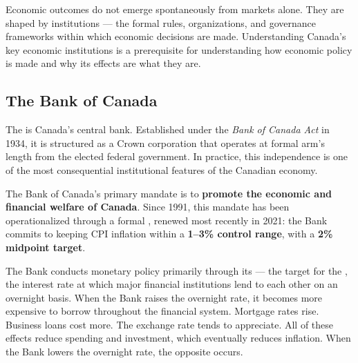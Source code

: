 Economic outcomes do not emerge spontaneously from markets alone. They are
shaped by institutions --- the formal rules, organizations, and governance
frameworks within which economic decisions are made. Understanding Canada's
key economic institutions is a prerequisite for understanding how economic
policy is made and why its effects are what they are.

\subsection{The Bank of Canada}

The  is Canada's central bank. Established under the
\textit{Bank of Canada Act} in 1934, it is structured as a Crown corporation
that operates at formal arm's length from the elected federal government.
In practice, this independence is one of the most consequential institutional
features of the Canadian economy.

The Bank of Canada's primary mandate is to \textbf{promote the economic and
financial welfare of Canada}. Since 1991, this mandate has been operationalized
through a formal , renewed most recently
in 2021: the Bank commits to keeping CPI inflation within a \textbf{1--3\%
control range}, with a \textbf{2\% midpoint target}.

The Bank conducts monetary policy primarily through its  --- the target for the , the interest rate at which
major financial institutions lend to each other on an overnight basis. When
the Bank raises the overnight rate, it becomes more expensive to borrow
throughout the financial system. Mortgage rates rise. Business loans cost more.
The exchange rate tends to appreciate. All of these effects reduce spending
and investment, which eventually reduces inflation. When the Bank lowers the
overnight rate, the opposite occurs.

